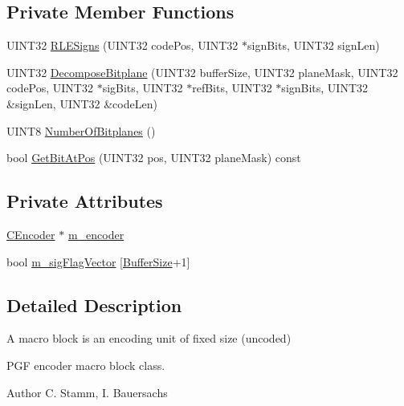 \subsection*{Private Member Functions}
\begin{DoxyCompactItemize}
\item 
U\+I\+N\+T32 \mbox{\hyperlink{classCEncoder_1_1CMacroBlock_a50637f0c6ccc3d29b10063204a55253b}{R\+L\+E\+Signs}} (U\+I\+N\+T32 code\+Pos, U\+I\+N\+T32 $\ast$sign\+Bits, U\+I\+N\+T32 sign\+Len)
\item 
U\+I\+N\+T32 \mbox{\hyperlink{classCEncoder_1_1CMacroBlock_a171a6f1d0d6297823542acc3cb43338a}{Decompose\+Bitplane}} (U\+I\+N\+T32 buffer\+Size, U\+I\+N\+T32 plane\+Mask, U\+I\+N\+T32 code\+Pos, U\+I\+N\+T32 $\ast$sig\+Bits, U\+I\+N\+T32 $\ast$ref\+Bits, U\+I\+N\+T32 $\ast$sign\+Bits, U\+I\+N\+T32 \&sign\+Len, U\+I\+N\+T32 \&code\+Len)
\item 
U\+I\+N\+T8 \mbox{\hyperlink{classCEncoder_1_1CMacroBlock_a152834c140a4fcf478a2295eb247f4d4}{Number\+Of\+Bitplanes}} ()
\item 
bool \mbox{\hyperlink{classCEncoder_1_1CMacroBlock_a84aa40ee75fb9d993c0cec207b4092e3}{Get\+Bit\+At\+Pos}} (U\+I\+N\+T32 pos, U\+I\+N\+T32 plane\+Mask) const
\end{DoxyCompactItemize}
\subsection*{Private Attributes}
\begin{DoxyCompactItemize}
\item 
\mbox{\hyperlink{classCEncoder}{C\+Encoder}} $\ast$ \mbox{\hyperlink{classCEncoder_1_1CMacroBlock_adf5e8e4952216e6fdd189224618edd50}{m\+\_\+encoder}}
\item 
bool \mbox{\hyperlink{classCEncoder_1_1CMacroBlock_a7acaa42598512b958d5e16b8bcded13b}{m\+\_\+sig\+Flag\+Vector}} \mbox{[}\mbox{\hyperlink{PGFtypes_8h_aa362edf6db9662acf6ef958a6db19c35}{Buffer\+Size}}+1\mbox{]}
\end{DoxyCompactItemize}


\subsection{Detailed Description}
A macro block is an encoding unit of fixed size (uncoded) 

P\+GF encoder macro block class. \begin{DoxyAuthor}{Author}
C. Stamm, I. Bauersachs 
\end{DoxyAuthor}


